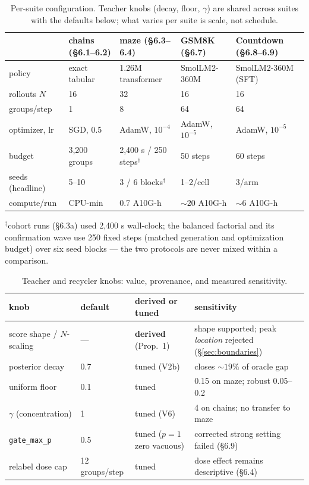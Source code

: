 \begin{table}[h]
\centering\small
\caption{Per-suite configuration. Teacher knobs (decay, floor, $\gamma$)
are shared across suites with the defaults below; what varies per suite
is scale, not schedule.}
\label{tab:suites}
\begin{tabular}{@{}lllll@{}}
\toprule
 & chains (\S6.1--6.2) & maze (\S6.3--6.4) & GSM8K (\S6.7) & Countdown (\S6.8--6.9) \\
\midrule
policy & exact tabular & 1.26M transformer & SmolLM2-360M & SmolLM2-360M (SFT) \\
rollouts $N$ & 16 & 32 & 16 & 16 \\
groups/step & 1 & 8 & 64 & 64 \\
optimizer, lr & SGD, 0.5 & AdamW, $10^{-4}$ & AdamW, $10^{-5}$ & AdamW, $10^{-5}$ \\
budget & 3{,}200 groups & 2{,}400 s / 250 steps$^{\dagger}$ & 50 steps & 60 steps \\
seeds (headline) & 5--10 & 3 / 6 blocks$^{\dagger}$ & 1--2/cell & 3/arm \\
compute/run & CPU-min & 0.7 A10G-h & ${\sim}20$ A10G-h & ${\sim}6$ A10G-h \\
\bottomrule
\end{tabular}

\smallskip
{\footnotesize $^{\dagger}$cohort runs (\S 6.3a) used 2{,}400 s
wall-clock; the balanced factorial and its confirmation wave use 250
fixed steps (matched generation and optimization budget) over six seed
blocks --- the two protocols are never mixed within a comparison.}
\end{table}

\begin{table}[h]
\centering\footnotesize
\setlength{\tabcolsep}{4pt}
\caption{Teacher and recycler knobs: value, provenance, and measured
sensitivity.}
\label{tab:knobs}
\begin{tabular}{@{}llll@{}}
\toprule
knob & default & derived or tuned & sensitivity \\
\midrule
score shape / $N$-scaling & --- & \textbf{derived} (Prop.~1) & shape supported; peak \emph{location} rejected (\S\ref{sec:boundaries}) \\
posterior decay & 0.7 & tuned (V2b) & closes ${\sim}19\%$ of oracle gap \\
uniform floor & 0.1 & tuned & 0.15 on maze; robust 0.05--0.2 \\
$\gamma$ (concentration) & 1 & tuned (V6) & 4 on chains; no transfer to maze \\
\texttt{gate\_max\_p} & 0.5 & tuned ($p{=}1$ zero vacuous) & corrected strong setting failed (\S6.9) \\
relabel dose cap & 12 groups/step & tuned & dose effect remains descriptive (\S6.4) \\
\bottomrule
\end{tabular}
\end{table}

